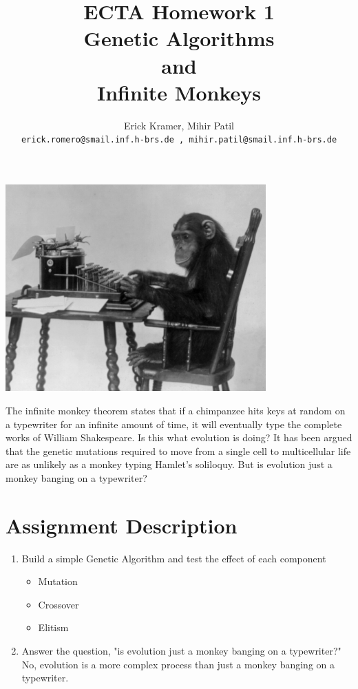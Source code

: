 \documentclass{article}
\title{ECTA Homework 1\\Genetic Algorithms\\and\\Infinite Monkeys}
\author{\color{blue}Erick Kramer, Mihir Patil\\ \texttt{\color{blue}erick.romero@smail.inf.h-brs.de , mihir.patil@smail.inf.h-brs.de}}
\begin{document}
\maketitle

\begin{center}
\begin{minipage}{1\linewidth}
	\begin{center}
    \includegraphics[width=0.75\textwidth]{img/chimp}  
    \end{center}
    
	{\large The infinite monkey theorem states that if a chimpanzee hits keys at random on a typewriter for an infinite amount of time, it will eventually type the complete works of William Shakespeare. Is this what evolution is doing? It has been argued that the genetic mutations required to move from a single cell to multicellular life are as unlikely as a monkey typing Hamlet's soliloquy. But is evolution just a monkey banging on a typewriter?}	
\end{minipage}
\end{center}

\section{Assignment Description}
	\begin{enumerate}
		\item Build a simple Genetic Algorithm and test the effect of each component
		\begin{itemize}
			\item Mutation
			\item Crossover
			\item Elitism		
		\end{itemize}
		\item {Answer the question, "is evolution just a monkey banging on a typewriter?"\\
			\color{blue}No, evolution is a more complex process than just a monkey banging on a typewriter.
			}	
	\end{enumerate}
\end{document}
